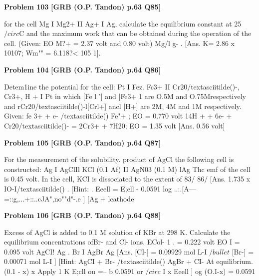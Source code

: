 \begin{problembox}
\textbf{Problem 103} \hfill \textbf{[GRB (O.P. Tandon) p.63 Q85]}
\label{q:ext-grb_all_questions-103}

for the cell Mg I Mg2+ II Ag+ I Ag, calculate the equilibrium 
constant at 25$/circ$C and the maximum work that can be obtained 
during the operation of the cell. 
(Given: EO 
M?+ = 2.37 volt and 
0.80 volt) 
Mg/l g-
. 
[Ans. 
K= 2.86 x 10107; Wm"" = 6.118?< 105 1].
\end{problembox}

\begin{problembox}
\textbf{Problem 104} \hfill \textbf{[GRB (O.P. Tandon) p.64 Q86]}
\label{q:ext-grb_all_questions-104}

Detem1ine the potential for the cell: 
Pt I Fez. Fc3+ II Cr20/textasciitilde()-, Cr3+, H + I Pt 
in which [Fe l '] and [Fe3+ 1 are O.5M and O.75Mrespectively 
and 
rCr20/textasciitilde()-l[Crl+] ancl [H+] are 2M, 4M and 1M 
respectively. Given: 
fe 3+ + e- /textasciitilde() 
Fe"+ ; 
EO = 0.770 volt 
14H + + 6e- + Cr20/textasciitilde()- = 2Cr3+ + 7H20; 
EO = 1.35 volt 
[Ans. 
0.56 volt]
\end{problembox}

\begin{problembox}
\textbf{Problem 105} \hfill \textbf{[GRB (O.P. Tandon) p.64 Q87]}
\label{q:ext-grb_all_questions-105}

For the measurement of the solubility. product of AgCl the 
following cell is constructed: 
Ag I AgClIl KCl (0.1 Af) II AgN03 (0.1 M) lAg 
Thc emf of the cell is 0.45 volt. In the cell, KCI is dissociated 
to the extent of 83/%
86/%
[Ans. 
1.735 x IO-I/textasciitilde() 
. 
[Hint: . Eeell = E;ell - 0.0591 log ..:.[A---=::g,...+::..cJA",no""d"-.e ] 
[Ag + lcathode
\end{problembox}

\begin{problembox}
\textbf{Problem 106} \hfill \textbf{[GRB (O.P. Tandon) p.64 Q88]}
\label{q:ext-grb_all_questions-106}

Excess of AgCl is added to 0.1 M solution of KBr at 298 K. 
Calculate the equilibrium concentrations ofBr- and Cl- ions. 
ECol- 1 
. 
= 0.222 volt 
EO \underline{\hspace{1cm}} 
I 
= 0.095 volt 
AgCI! Ag 
. 
Br I AgBr Ag 
[Ans. 
[CI-] = 0.09929 mol L-I $/bullet$ [Br-] = 0.00071 mol L-I ] 
[Hint: 
AgCI + 
Br-
/textasciitilde() 
AgBr + CI-
At equilibrium. 
(0.1 - x) 
x 
Apply 
1 
K 
E;cll 
ou =--
b 
0.0591 
or 
$/circ$ 
I 
x 
Eeell ] 
og (O.I-x) = 0.0591
\end{problembox}

